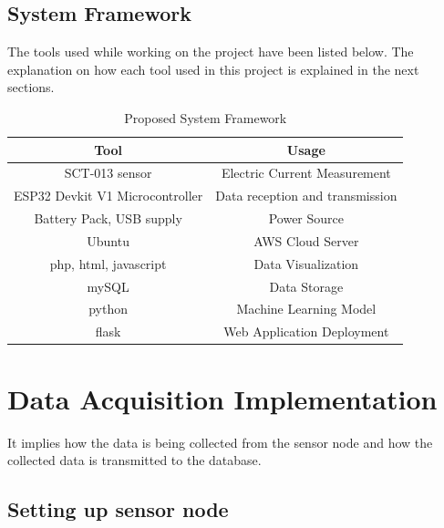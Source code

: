 \documentclass[12 pt]{report}
\begin{document}
\subsection{System Framework}
 \item The tools used while working on the project have been listed below. The explanation on how each tool used in this project is explained in the next sections.
 \newline
 \begin{table}[ht]
     \centering
   \begin{tabular}{||c| c||}
  \hline
     Tool  &  Usage\\ [0.5ex]
  \hline\hline   
     SCT-013 sensor  &  Electric Current Measurement\\
  \hline   
     ESP32 Devkit V1 Microcontroller  &  Data reception and transmission\\
  \hline 
     Battery Pack, USB supply  &  Power Source\\
  \hline
     Ubuntu  &  AWS Cloud Server\\
  \hline   
     php, html, javascript  &  Data Visualization\\
  \hline
     mySQL  &  Data Storage\\
  \hline 
     python  &  Machine Learning Model\\
  \hline 
     flask  &  Web Application Deployment\\ [1ex]
  \hline 
  \end{tabular}
  \caption{Proposed System Framework}
   \end{table}




\section{Data Acquisition Implementation}

It  implies how the data is being  collected from the sensor node and how the collected data is transmitted to the database.
\subsection{Setting up sensor node}
\end{document}
